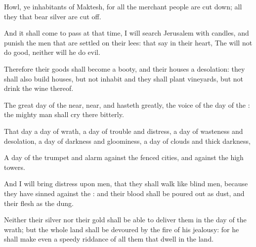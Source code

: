{Howl, ye
inhabitants of
Maktesh, for all the
merchant
people are cut
down; all they that
bear
silver are cut
off.

And it shall come to pass at that
time,
{} I will
search
Jerusalem with
candles, and
punish the
men that are
settled on their
lees: that
say in their
heart, The
{} will not do
good, neither will he do
evil.

Therefore their
goods shall become a
booty, and their
houses a
desolation: they shall also
build
houses, but not
inhabit
{} and they shall
plant
vineyards, but not
drink the
wine thereof.


\par }{\PP {}The
great
day of the
{}
{}
near,
{}
near, and
hasteth
greatly,
{} the
voice of the
day of the
{}: the mighty
man shall
cry there
bitterly.

That
day
{} a
day of
wrath, a
day of
trouble and
distress, a
day of
wasteness and
desolation, a
day of
darkness and
gloominess, a
day of
clouds and thick
darkness,

A
day of the
trumpet and
alarm against the
fenced
cities, and against the
high
towers.

And I will bring
distress upon
men, that they shall
walk like blind
men, because they have
sinned against the
{}: and their
blood shall be poured
out as
dust, and their
flesh as the
dung.

Neither their
silver nor their
gold shall be
able to
deliver them in the
day of the
{}
wrath; but the whole
land shall be
devoured by the
fire of his
jealousy: for he shall
make even a
speedy
riddance of all them that
dwell in the
land.




\par }
